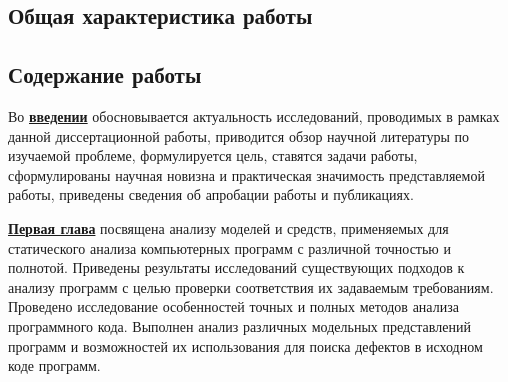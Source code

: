 \subsection*{Общая характеристика работы}

\newcommand{\actuality}{\underline{\textbf{Актуальность темы.}}}
\newcommand{\aim}{\underline{\textbf{Целью}}}
\newcommand{\tasks}{\underline{\textbf{задачи}}}
\newcommand{\defpositions}{\underline{\textbf{Основные положения, выносимые на~защиту:}}}
\newcommand{\novelty}{\underline{\textbf{Научная новизна:}}}
\newcommand{\influence}{\underline{\textbf{Практическая значимость}}}
\newcommand{\reliability}{\underline{\textbf{Достоверность}}}
\newcommand{\probation}{\underline{\textbf{Апробация работы.}}}
\newcommand{\contribution}{\underline{\textbf{Личный вклад.}}}
\newcommand{\publications}{\underline{\textbf{Публикации.}}}




\subsection*{Содержание работы}
Во \underline{\textbf{введении}} обосновывается актуальность исследований, проводимых в рамках данной диссертационной работы, приводится обзор научной литературы по изучаемой проблеме, формулируется цель, ставятся задачи работы, сформулированы научная новизна и практическая значимость представляемой работы, приведены сведения об апробации работы и публикациях.

\underline{\textbf{Первая глава}} посвящена анализу моделей и средств, применяемых для статического анализа компьютерных программ с различной точностью и полнотой. Приведены результаты исследований существующих подходов к анализу программ с целью проверки соответствия их задаваемым требованиям. Проведено исследование особенностей точных и полных методов анализа программного кода. Выполнен анализ различных модельных представлений программ и возможностей их использования для поиска дефектов в исходном коде программ.

